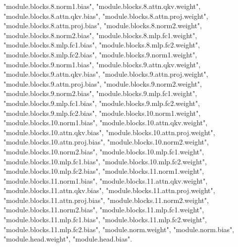 "module.blocks.8.norm1.bias", "module.blocks.8.attn.qkv.weight", "module.blocks.8.attn.qkv.bias", "module.blocks.8.attn.proj.weight", "module.blocks.8.attn.proj.bias", "module.blocks.8.norm2.weight", "module.blocks.8.norm2.bias", "module.blocks.8.mlp.fc1.weight", "module.blocks.8.mlp.fc1.bias", "module.blocks.8.mlp.fc2.weight", "module.blocks.8.mlp.fc2.bias", "module.blocks.9.norm1.weight", "module.blocks.9.norm1.bias", "module.blocks.9.attn.qkv.weight", "module.blocks.9.attn.qkv.bias", "module.blocks.9.attn.proj.weight", "module.blocks.9.attn.proj.bias", "module.blocks.9.norm2.weight", "module.blocks.9.norm2.bias", "module.blocks.9.mlp.fc1.weight", "module.blocks.9.mlp.fc1.bias", "module.blocks.9.mlp.fc2.weight", "module.blocks.9.mlp.fc2.bias", "module.blocks.10.norm1.weight", "module.blocks.10.norm1.bias", "module.blocks.10.attn.qkv.weight", "module.blocks.10.attn.qkv.bias", "module.blocks.10.attn.proj.weight", "module.blocks.10.attn.proj.bias", "module.blocks.10.norm2.weight", "module.blocks.10.norm2.bias", "module.blocks.10.mlp.fc1.weight", "module.blocks.10.mlp.fc1.bias", "module.blocks.10.mlp.fc2.weight", "module.blocks.10.mlp.fc2.bias", "module.blocks.11.norm1.weight", "module.blocks.11.norm1.bias", "module.blocks.11.attn.qkv.weight", "module.blocks.11.attn.qkv.bias", "module.blocks.11.attn.proj.weight", "module.blocks.11.attn.proj.bias", "module.blocks.11.norm2.weight", "module.blocks.11.norm2.bias", "module.blocks.11.mlp.fc1.weight", "module.blocks.11.mlp.fc1.bias", "module.blocks.11.mlp.fc2.weight", "module.blocks.11.mlp.fc2.bias", "module.norm.weight", "module.norm.bias", "module.head.weight", "module.head.bias". 

